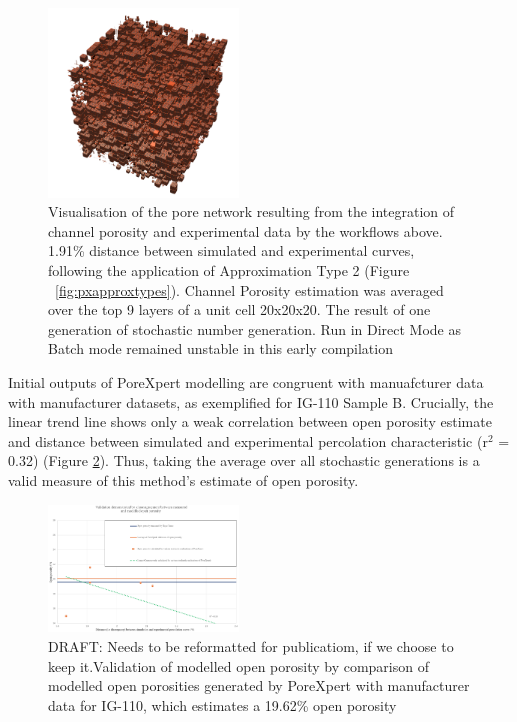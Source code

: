 \documentclass[review]{elsarticle}
\begin{document}
      \begin{figure}
        \centering
        \includegraphics[width=0.45\textwidth]{./Media/unit cell no bg.png}
        \caption{Visualisation of the pore network resulting from the
        integration of channel porosity and experimental data by the workflows
        above. 1.91\% distance between simulated and experimental curves,
        following the application of Approximation Type 2 (Figure
        ~\ref{fig:pxapproxtypes}). Channel Porosity estimation was averaged over
        the top 9 layers of a unit cell 20x20x20. The result of one generation
        of stochastic number generation. Run in Direct Mode as Batch mode
        remained unstable in this early compilation}
        \label{fig:PX3dnetwork}
    \end{figure}

    Initial outputs of PoreXpert modelling are congruent with manuafcturer data
    with manufacturer datasets, as exemplified for IG-110 Sample B.
    Crucially, the linear trend line shows only a weak correlation between open
    porosity estimate and distance between simulated and experimental
    percolation characteristic (r\(^2\) = 0.32) (Figure
    \ref{fig:validationgraph}). Thus, taking the average over all stochastic
    generations is a valid measure of this method's estimate of
    open porosity. 

\begin{figure}
    \centering
    \includegraphics[width=0.45\textwidth]{./Media/ValidationGraph.png}
    \caption{DRAFT: Needs to be reformatted for publicatiom, if we choose to keep it.Validation of modelled open porosity by comparison of modelled open porosities generated by PoreXpert with manufacturer data for IG-110, which estimates a 19.62\% open porosity \cite{Jones2018}}
    \label{fig:validationgraph}
\end{figure}
\end{document}
